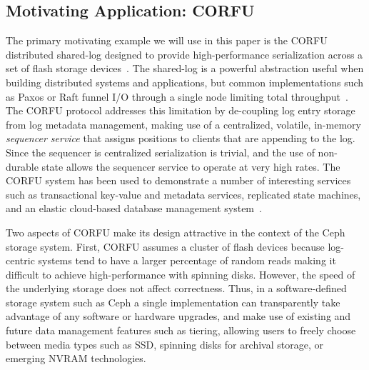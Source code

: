 \documentclass[10pt,twocolumn]{article}
\begin{document}
\subsection{Motivating Application: CORFU}

The primary motivating example we will use in this paper is the CORFU
distributed shared-log designed to provide high-performance serialization
across a set of flash storage devices~\cite{balakrishnan:nsdi12}. The
shared-log is a powerful abstraction useful when building distributed systems
and applications, but common implementations such as Paxos or Raft funnel I/O
through a single node limiting total throughput~\cite{lamport:tocs89}. The CORFU protocol addresses this limitation
by de-coupling log entry storage from log metadata management, making use of a
centralized, volatile, in-memory \emph{sequencer service} that assigns
positions to clients that are appending to the log. Since the sequencer is
centralized serialization is trivial, and the use of non-durable state allows
the sequencer service to operate at very high rates. The CORFU system has been
used to demonstrate a number of interesting services such as transactional
key-value and metadata services, replicated state machines, and an elastic
cloud-based database management system~\cite{balakrishnan:sosp13,bernstein:cidr11}.

Two aspects of CORFU make its design attractive in the context of the Ceph
storage system. First, CORFU assumes a cluster of flash devices because
log-centric systems tend to have a larger percentage of random reads making it
difficult to achieve high-performance with spinning disks. However, the speed
of the underlying storage does not affect correctness. Thus, in a
software-defined storage system such as Ceph a single implementation can
transparently take advantage of any software or hardware upgrades, and make use
of existing and future data management features such as tiering,
allowing users to freely choose between media types such as SSD, spinning
disks for archival storage, or emerging NVRAM technologies.
\end{document}
